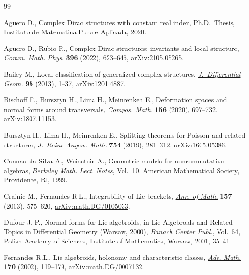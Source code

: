 \documentclass[pdftex]{sigma}
\numberwithin{equation}{section}
\begin{document}
\begin{thebibliography}{99}
\footnotesize\itemsep=-1pt

Aguero D., Complex {D}irac structures with constant real index, Ph.D.~Thesis,
 {I}nstituto de Matematica Pura e Aplicada, 2020.

Aguero D., Rubio R., Complex {D}irac structures: invariants and local
 structure, \href{https://doi.org/10.1007/s00220-022-04471-1}{\textit{Comm.
 Math. Phys.}} \textbf{396} (2022), 623--646,
 \href{http://arxiv.org/abs/2105.05265}{arXiv:2105.05265}.

Bailey M., Local classification of generalized complex structures,
 \href{https://doi.org/10.4310/jdg/1375124607}{\textit{J.~Differential Geom.}}
 \textbf{95} (2013), 1--37,
 \href{http://arxiv.org/abs/1201.4887}{arXiv:1201.4887}.

Bischoff F., Bursztyn H., Lima H., Meinrenken E., Deformation spaces and normal
 forms around transversals,
 \href{https://doi.org/10.1112/s0010437x1900784x}{\textit{Compos. Math.}}
 \textbf{156} (2020), 697--732,
 \href{http://arxiv.org/abs/1807.11153}{arXiv:1807.11153}.

Bursztyn H., Lima H., Meinrenken E., Splitting theorems for {P}oisson and
 related structures,
 \href{https://doi.org/10.1515/crelle-2017-0014}{\textit{J.~Reine Angew.
 Math.}} \textbf{754} (2019), 281--312,
 \href{http://arxiv.org/abs/1605.05386}{arXiv:1605.05386}.

Cannas~da Silva A., Weinstein A., Geometric models for noncommutative algebras,
 \textit{Berkeley Math. Lect. Notes}, Vol.~10, American Mathematical Society,
 Providence, RI, 1999.

Crainic M., Fernandes R.L., Integrability of {L}ie brackets,
 \href{https://doi.org/10.4007/annals.2003.157.575}{\textit{Ann. of Math.}}
 \textbf{157} (2003), 575--620,
 \href{http://arxiv.org/abs/math.DG/0105033}{arXiv:math.DG/0105033}.

Dufour J.-P., Normal forms for {L}ie algebroids, in Lie Algebroids and Related
 Topics in Differential Geometry ({W}arsaw, 2000), \textit{Banach Center
 Publ.}, Vol.~54, \href{https://doi.org/10.4064/bc54-0-3}{Polish Academy of
 Sciences, Institute of Mathematics}, Warsaw, 2001, 35--41.

Fernandes R.L., Lie algebroids, holonomy and characteristic classes,
 \href{https://doi.org/10.1006/aima.2001.2070}{\textit{Adv. Math.}}
 \textbf{170} (2002), 119--179,
 \href{http://arxiv.org/abs/math.DG/0007132}{arXiv:math.DG/0007132}.


\end{thebibliography}
\end{document}
